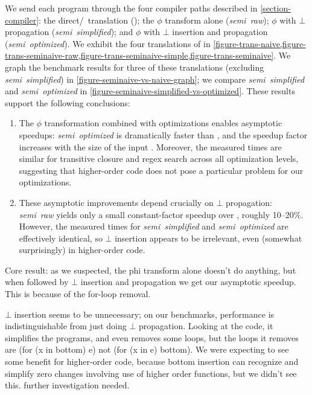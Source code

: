 

\noindent
We send each program through the four compiler paths described in \cref{section-compiler}: the direct/\naive\ translation (\emph{\naive}); the $\phi$ transform alone (\emph{semi\naive\ raw}); $\phi$ with $\bot$ propagation (\emph{semi\naive\ simplified}); and $\phi$ with $\bot$ insertion and propagation (\emph{semi\naive\ optimized}).
%
We exhibit the four translations of  in \cref{figure-trans-naive,figure-trans-seminaive-raw,figure-trans-seminaive-simple,figure-trans-seminaive}.
%
We graph the benchmark results for three of these translations (excluding \emph{semi\naive\ simplified}) in \cref{figure-seminaive-vs-naive-graph}; we compare \emph{semi\naive\ simplified} and \emph{semi\naive\ optimized} in \cref{figure-seminaive-simplified-vs-optimized}.
%
These results support the following conclusions:

\begin{enumerate}
\item The $\phi$ transformation combined with optimizations enables asymptotic
  speedups: \emph{semi\naive\ optimized} is dramatically faster than
  \emph{\naive,} and the speedup factor increases with the size of the input
  .
%
  Moreover, the measured times are similar for transitive closure and regex
  search across all optimization levels, suggesting that higher-order code does
  not pose a particular problem for our optimizations.

\item These asymptotic improvements depend crucially on $\bot$ propagation:
  \emph{semi\naive\ raw} yields only a small constant-factor speedup over
  \emph{\naive}, roughly 10--20\%.
%
  However, the measured times for \emph{semi\naive\ simplified} and
  \emph{semi\naive\ optimized} are effectively identical, so $\bot$ insertion
  appears to be irrelevant, even (somewhat surprisingly) in higher-order code.
  \XXX
\end{enumerate}

\XXX
Core result: as we suspected, the phi transform alone doesn't do anything, but when followed by $\bot$ insertion and propagation we get our asymptotic speedup. This is because of the for-loop removal.

\XXX
$\bot$ insertion seems to be unnecessary; on our benchmarks, performance is indistinguishable from just doing $\bot$ propagation. Looking at the code, it simplifies the programs, and even removes some loops, but the loops it removes are (for (x in bottom) e) not (for (x in e) bottom).  We were expecting to see some benefit for higher-order code, because bottom insertion can recognize and simplify zero changes involving use of higher order functions, but we didn't see this. further investigation needed.

